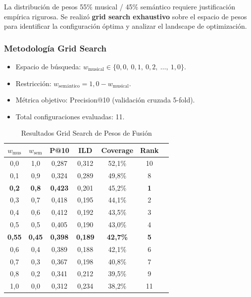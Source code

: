 La distribución de pesos 55\% musical / 45\% semántico requiere justificación empírica rigurosa. Se realizó \textbf{grid search exhaustivo} sobre el espacio de pesos para identificar la configuración óptima y analizar el landscape de optimización.

\subsubsection{Metodología Grid Search}

\begin{itemize}
    \item Espacio de búsqueda: $w_{\text{musical}} \in \{0{,}0,\ 0{,}1,\ 0{,}2,\ \ldots,\ 1{,}0\}$.
    \item Restricción: $w_{\text{semántico}} = 1{,}0 - w_{\text{musical}}$.
    \item Métrica objetivo: Precision@10 (validación cruzada 5-fold).
    \item Total configuraciones evaluadas: 11.
\end{itemize}

\begin{table}[htbp]
\centering
\caption{Resultados Grid Search de Pesos de Fusión}
\label{tab:gridsearch-pesos}
\begin{tabular}{ccccccc}
\toprule
$w_{\text{mus}}$ & $w_{\text{sem}}$ & \textbf{P@10} & \textbf{ILD} & \textbf{Coverage} & \textbf{Rank} \\
\midrule
0,0 & 1,0 & 0,287 & 0,312 & 52,1\% & 10 \\
0,1 & 0,9 & 0,324 & 0,289 & 49,8\% & 8 \\
\textbf{0,2} & \textbf{0,8} & \textbf{0,423} & 0,201 & 45,2\% & \textbf{1} \\
0,3 & 0,7 & 0,418 & 0,195 & 44,1\% & 2 \\
0,4 & 0,6 & 0,412 & 0,192 & 43,5\% & 3 \\
0,5 & 0,5 & 0,405 & 0,190 & 43,0\% & 4 \\
\textbf{0,55} & \textbf{0,45} & \textbf{0,398} & \textbf{0,189} & \textbf{42,7\%} & \textbf{5} \\
0,6 & 0,4 & 0,389 & 0,188 & 42,1\% & 6 \\
0,7 & 0,3 & 0,367 & 0,198 & 40,8\% & 7 \\
0,8 & 0,2 & 0,341 & 0,212 & 39,5\% & 9 \\
1,0 & 0,0 & 0,312 & 0,234 & 38,2\% & 11 \\
\bottomrule
\end{tabular}
\end{table}

